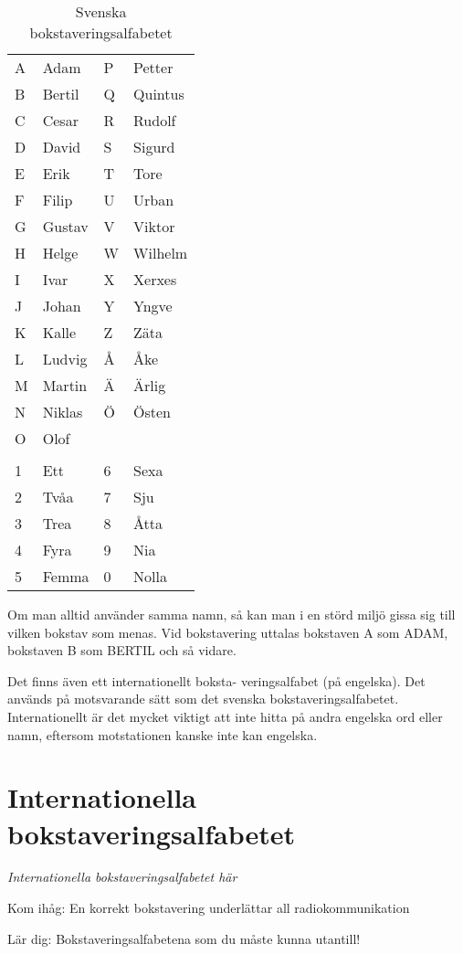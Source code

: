 \begin{table}[h]
  \begin{tabular}{ll|ll}
    A & Adam   & P & Petter  \\
    B & Bertil & Q & Quintus \\
    C & Cesar  & R & Rudolf  \\
    D & David  & S & Sigurd  \\
    E & Erik   & T & Tore    \\
    F & Filip  & U & Urban   \\
    G & Gustav & V & Viktor  \\
    H & Helge  & W & Wilhelm \\
    I & Ivar   & X & Xerxes  \\
    J & Johan  & Y & Yngve   \\
    K & Kalle  & Z & Zäta    \\
    L & Ludvig & Å & Åke     \\
    M & Martin & Ä & Ärlig   \\
    N & Niklas & Ö & Östen   \\
    O & Olof   &   &  \\
    &        &   &  \\
    1 & Ett    & 6 & Sexa    \\
    2 & Tvåa   & 7 & Sju     \\
    3 & Trea   & 8 & Åtta    \\
    4 & Fyra   & 9 & Nia     \\
    5 & Femma  & 0 & Nolla
  \end{tabular}
  \caption{Svenska bokstaveringsalfabetet}
  \label{tab:sv-bokstavering}
\end{table}

Om man alltid använder samma namn, så kan man i en störd miljö gissa
sig till vilken bokstav som menas. Vid bokstavering uttalas bokstaven
A som ADAM, bokstaven B som BERTIL och så vidare.

Det finns även ett internationellt boksta- veringsalfabet (på
engelska). Det används på motsvarande sätt som det svenska
bokstaveringsalfabetet. Internationellt är det mycket viktigt att inte
hitta på andra engelska ord eller namn, eftersom motstationen kanske
inte kan engelska.

\section{Internationella bokstaveringsalfabetet}
\emph{Internationella bokstaveringsalfabetet här}

Kom ihåg: En korrekt bokstavering underlättar all radiokommunikation

Lär dig: Bokstaveringsalfabetena som du måste kunna utantill!
